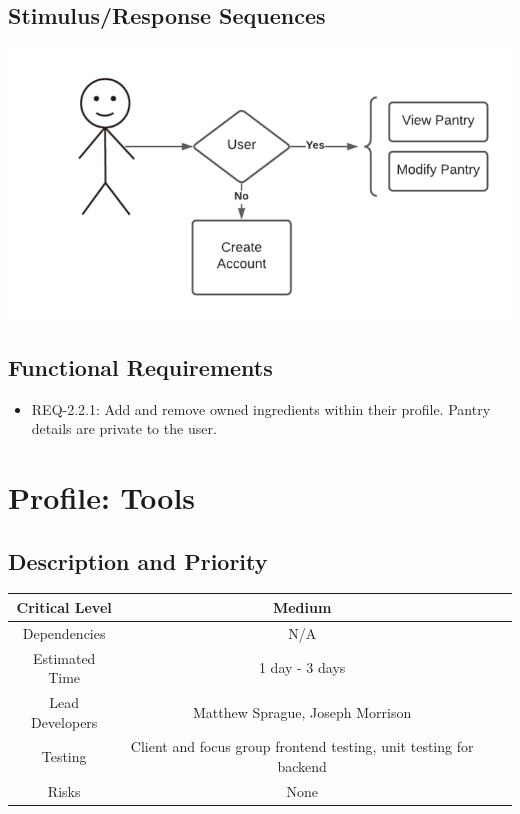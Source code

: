\documentclass{scrreprt}
\begin{document}
\subsection{Stimulus/Response Sequences}

\includegraphics{FlowCharts/Profile-Pantry.png}

\subsection{Functional Requirements}

\begin{itemize}
    \item REQ-2.2.1: Add and remove owned ingredients within their profile. Pantry details are private to the user.
\end{itemize}

\section{Profile: Tools}

\subsection{Description and Priority}
\begin{center}
    \begin{tabular}{| c | c | c | c |}
        \hline
        Critical Level & Medium \\
        \hline
        Dependencies & N/A \\
        \hline
        Estimated Time & 1 day - 3 days \\
        \hline
        Lead Developers & Matthew Sprague, Joseph Morrison \\
        \hline
        Testing & Client and focus group frontend testing, unit testing for backend \\
        \hline
        Risks & None \\
        \hline
    \end{tabular}
\end{center}
\end{document}
